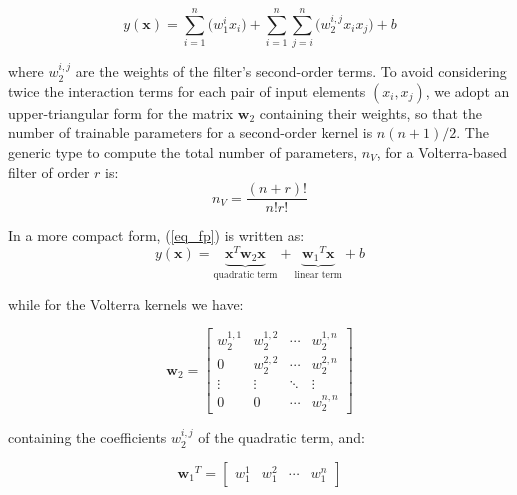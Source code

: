 \documentclass[10pt,twocolumn,letterpaper]{article}
\renewcommand{\vec}[1]{\mathbf{#1}}
\begin{document}
	\begin{equation}	\label{eq_fp}
       y(\vec{x}) = 
	      \sum_{i=1}^{n}{
	          \big(w_1^ix_i\big)} 
	    + \sum_{i=1}^{n}{\sum_{j=i}^{n}{
	          \big(w_2^{i,j} x_ix_j \big)}}
	    + b
    \end{equation}       

where $w_2^{i,j}$ are the weights of the filter's second-order terms. To avoid considering twice the interaction terms for each pair of input elements $(x_i,x_j)$, we adopt an upper-triangular form for the matrix $\vec{w}_2$ containing their weights, so that the number of trainable parameters for a second-order kernel is $n(n+1)/2$. The generic type to compute the total number of parameters, $n_V$, for a Volterra-based filter of order $r$ is:
       \begin{equation}
       \label{eq_nv}
       n_V = \frac{(n + r)!}{n! r!}
       \end{equation}
       
In a more compact form, (\ref{eq_fp}) is written as:
       \begin{equation}
       y(\vec{x}) = \underbrace{ \vec{x}^T \vec{w}_2 \vec{x} }_\text{quadratic term} + \underbrace{ {\vec{w}_1}^T \vec{x} }_\text{linear term} + b
       \end{equation}
       
       while for the Volterra kernels we have:

       \begin{equation}
       \vec{w}_2 = \begin{bmatrix}
                     w_2^{1,1} & w_2^{1,2} & \cdots & w_2^{1,n} \\ 
                     0         & w_2^{2,2} & \cdots & w_2^{2,n} \\ 
                     \vdots    & \vdots    & \ddots  & \vdots\\ 
                     0         & 0         & \cdots  & w_2^{n,n}
       \end{bmatrix}
       \end{equation}

containing the coefficients $w_2^{i,j}$ of the quadratic term, and:

       \begin{equation}{\vec{w}_1}^T = \begin{bmatrix}
                                w_1^1 & w_1^2 & \cdots & w_1^n
       \end{bmatrix}
       \end{equation}
\end{document}
